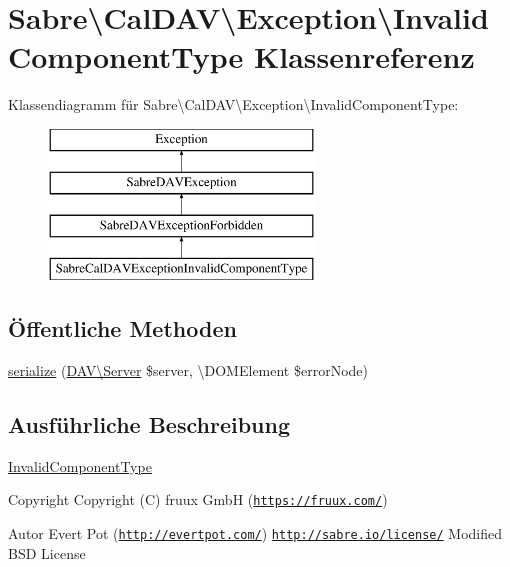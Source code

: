 \hypertarget{class_sabre_1_1_cal_d_a_v_1_1_exception_1_1_invalid_component_type}{}\section{Sabre\textbackslash{}Cal\+D\+AV\textbackslash{}Exception\textbackslash{}Invalid\+Component\+Type Klassenreferenz}
\label{class_sabre_1_1_cal_d_a_v_1_1_exception_1_1_invalid_component_type}
Klassendiagramm für Sabre\textbackslash{}Cal\+D\+AV\textbackslash{}Exception\textbackslash{}Invalid\+Component\+Type\+:\begin{figure}[H]
\begin{center}
\leavevmode
\includegraphics[height=4.000000cm]{class_sabre_1_1_cal_d_a_v_1_1_exception_1_1_invalid_component_type}
\end{center}
\end{figure}
\subsection*{Öffentliche Methoden}
\begin{DoxyCompactItemize}
\item 
\mbox{\hyperlink{class_sabre_1_1_cal_d_a_v_1_1_exception_1_1_invalid_component_type_ac911630fa915118e3c12be021e7d0abe}{serialize}} (\mbox{\hyperlink{class_sabre_1_1_d_a_v_1_1_server}{D\+A\+V\textbackslash{}\+Server}} \$server, \textbackslash{}D\+O\+M\+Element \$error\+Node)
\end{DoxyCompactItemize}


\subsection{Ausführliche Beschreibung}
\mbox{\hyperlink{class_sabre_1_1_cal_d_a_v_1_1_exception_1_1_invalid_component_type}{Invalid\+Component\+Type}}

\begin{DoxyCopyright}{Copyright}
Copyright (C) fruux GmbH (\href{https://fruux.com/}{\tt https\+://fruux.\+com/}) 
\end{DoxyCopyright}
\begin{DoxyAuthor}{Autor}
Evert Pot (\href{http://evertpot.com/}{\tt http\+://evertpot.\+com/})  \href{http://sabre.io/license/}{\tt http\+://sabre.\+io/license/} Modified B\+SD License 
\end{DoxyAuthor}


